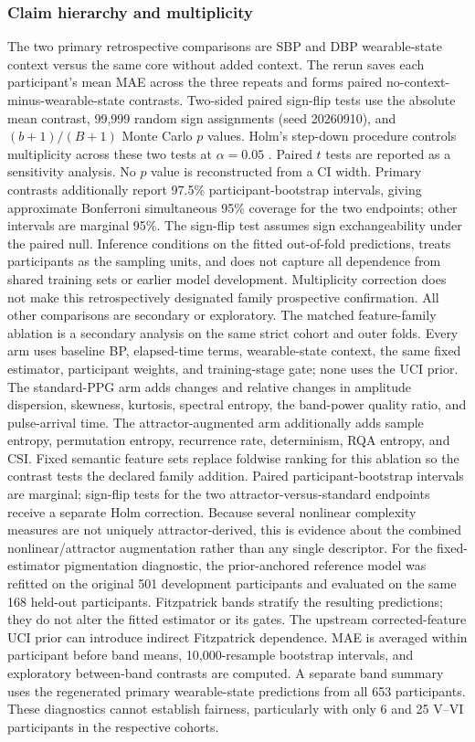 \documentclass[12pt]{article}
\let\cite\citep
\begin{document}
\subsubsection{Claim hierarchy and multiplicity}
The two primary retrospective comparisons are SBP and DBP wearable-state context versus the same core without added context. The rerun saves each participant's mean MAE across the three repeats and forms paired no-context-minus-wearable-state contrasts. Two-sided paired sign-flip tests use the absolute mean contrast, 99{,}999 random sign assignments (seed 20260910), and $(b+1)/(B+1)$ Monte Carlo $p$ values. Holm's step-down procedure controls multiplicity across these two tests at $\alpha=0.05$ \cite{holm1979}. Paired $t$ tests are reported as a sensitivity analysis. No $p$ value is reconstructed from a CI width. Primary contrasts additionally report 97.5\% participant-bootstrap intervals, giving approximate Bonferroni simultaneous 95\% coverage for the two endpoints; other intervals are marginal 95\%. The sign-flip test assumes sign exchangeability under the paired null. Inference conditions on the fitted out-of-fold predictions, treats participants as the sampling units, and does not capture all dependence from shared training sets or earlier model development. Multiplicity correction does not make this retrospectively designated family prospective confirmation. All other comparisons are secondary or exploratory.
The matched feature-family ablation is a secondary analysis on the same strict cohort and outer folds. Every arm uses baseline BP, elapsed-time terms, wearable-state context, the same fixed estimator, participant weights, and training-stage gate; none uses the UCI prior. The standard-PPG arm adds changes and relative changes in amplitude dispersion, skewness, kurtosis, spectral entropy, the band-power quality ratio, and pulse-arrival time. The attractor-augmented arm additionally adds sample entropy, permutation entropy, recurrence rate, determinism, RQA entropy, and CSI. Fixed semantic feature sets replace foldwise ranking for this ablation so the contrast tests the declared family addition. Paired participant-bootstrap intervals are marginal; sign-flip tests for the two attractor-versus-standard endpoints receive a separate Holm correction. Because several nonlinear complexity measures are not uniquely attractor-derived, this is evidence about the combined nonlinear/attractor augmentation rather than any single descriptor.
For the fixed-estimator pigmentation diagnostic, the prior-anchored reference model was refitted on the original 501 development participants and evaluated on the same 168 held-out participants. Fitzpatrick bands stratify the resulting predictions; they do not alter the fitted estimator or its gates. The upstream corrected-feature UCI prior can introduce indirect Fitzpatrick dependence. MAE is averaged within participant before band means, 10{,}000-resample bootstrap intervals, and exploratory between-band contrasts are computed. A separate band summary uses the regenerated primary wearable-state predictions from all 653 participants. These diagnostics cannot establish fairness, particularly with only 6 and 25 V--VI participants in the respective cohorts.
\end{document}
